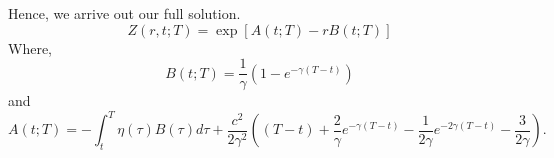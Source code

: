 \documentclass[11pt]{article}
\begin{document}
Hence, we arrive out our full solution.
\begin{equation}
    Z(r,t;T) = \exp \left[ A(t;T) - r B(t;T) \right]
\end{equation}
Where,
\begin{equation}
    B(t;T) = \frac{1}{\gamma} (1 - e^{-\gamma (T-t)})
\end{equation}
and
\begin{equation}
    A(t;T) = -\int_{t}^{T} \eta(\tau) B(\tau) d\tau + \frac{c^2}{2\gamma^2} \left( (T-t) + \frac{2}{\gamma} e^{-\gamma(T-t)} - \frac{1}{2\gamma} e^{-2\gamma (T-t)} - \frac{3}{2\gamma} \right).
\end{equation}
\end{document}

